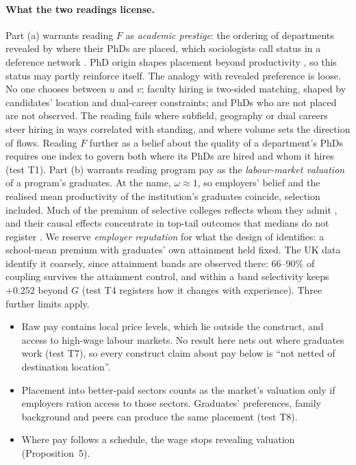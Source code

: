 \paragraph{What the two readings license.} Part (a) warrants reading $F$ as \emph{academic prestige}: the
ordering of departments revealed by where their PhDs are placed, which sociologists call status in a deference
network \citep{burris2004academic,podolny1993status,sauder2012status}. PhD origin shapes placement beyond
productivity \citep{long1979entrance}, so this status may partly reinforce itself. The analogy with revealed
preference is loose. No one chooses between $u$ and $v$; faculty hiring is two-sided matching, shaped by
candidates' location and dual-career constraints; and PhDs who are not placed are not observed. The reading fails
where subfield, geography or dual careers steer hiring in ways correlated with standing, and where volume sets
the direction of flows. Reading $F$ further as a belief about the quality of a department's PhDs requires one
index to govern both where its PhDs are hired and whom it hires (test T1). Part (b) warrants reading program pay
as the \emph{labour-market valuation} of a program's graduates. At the name, $\omega\approx1$, so employers'
belief and the realised mean productivity of the institution's graduates coincide, selection included. Much of
the premium of selective colleges reflects whom they admit \citep{dale2002estimating,dale2014estimating}, and
their causal effects concentrate in top-tail outcomes that medians do not register
\citep{zimmerman2019elite,chetty2023diversifying}. We reserve \emph{employer reputation} for what the design of
\citet{macleod2017big} identifies: a school-mean premium with graduates' own attainment held fixed. The UK data
identify it coarsely, since attainment bands are observed there: 66--90\% of coupling survives the attainment
control, and within a band selectivity keeps $+0.252$ beyond $G$ (test T4 registers how it changes with
experience). Three further limits apply.
\begin{itemize}
\item Raw pay contains local price levels, which lie outside the construct, and access to high-wage labour
markets. No result here nets out where graduates work (test T7), so every construct claim about pay below is
``not netted of destination location''.
\item Placement into better-paid sectors counts as the market's valuation only if employers ration access to
those sectors. Graduates' preferences, family background and peers can produce the same placement (test T8).
\item Where pay follows a schedule, the wage stops revealing valuation (Proposition~5).
\end{itemize}

